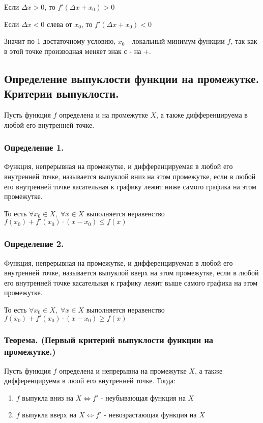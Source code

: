 \documentclass[a4paper,12pt]{article}
\theoremstyle{plain} %
\theoremstyle{definition} %
\theoremstyle{remark} %
\begin{document}
Если $\Delta x > 0$, то $f'(\Delta x + x_0) > 0$

Если $\Delta x < 0$ слева от $x_0$, то $f'(\Delta x + x_0) < 0$

Значит по 1 достаточному условию, $x_0$ - локальный минимум функции $f$, так как в этой точке производная меняет знак с - на +.


\newpage
{}
\subsection*{Определение выпуклости функции на промежутке. Критерии выпуклости.                                       }
Пусть функция $f$ определена и на промежутке $X$, а также дифференцируема в любой его внутренней точке.

\subsubsection*{Определение 1.}
Функция, непрерывная на промежутке, и дифференцируемая в любой его внутренней точке, называется выпуклой вниз на этом промежутке, если в любой его внутренней точке касательная к графику лежит ниже самого графика на этом промежутке.

То есть $\forall x_0 \in X, \; \forall x \in X$ выполняется неравенство $f(x_0) + f'(x_0) \cdot (x - x_0) \leq f(x)$

\subsubsection*{Определение 2.}
Функция, непрерывная на промежутке, и дифференцируемая в любой его внутренней точке, называется выпуклой вверх на этом промежутке, если в любой его внутренней точке касательная к графику лежит выше самого графика на этом промежутке.

То есть $\forall x_0 \in X, \; \forall x \in X$ выполняется неравенство $f(x_0) + f'(x_0) \cdot (x - x_0) \geq f(x)$

\subsubsection*{Теорема. (Первый критерий выпуклости функции на промежутке.)}
Пусть функция $f$ определена и непрерывна на промежутке $X$, а также дифференцируема в люой его внутренней точке. Тогда:

\begin{enumerate}
	\item $f$ выпукла вниз на $X \Leftrightarrow f'$ - неубывающая функция на $X$
	\item $f$ выпукла вверх на $X \Leftrightarrow f'$ - невозрастающая функция на $X$
\end{enumerate}
\end{document}
